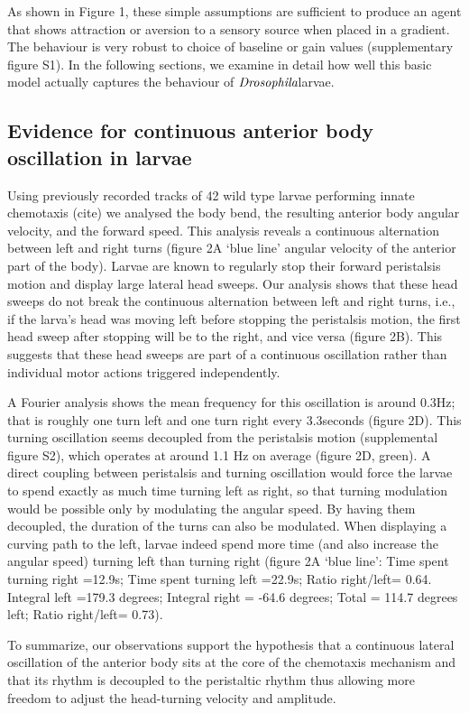 \documentclass[10pt,a4paper]{article}
\newcommand{\Dros }{$\mathrm{\emph{Drosophila}}$}
\begin{document}
As shown in Figure 1, these simple assumptions are sufficient to produce an agent that shows attraction or aversion to a sensory source when placed in a gradient.  The behaviour is very robust to choice of baseline or gain values (supplementary figure S1). In the following sections, we examine in detail how well this basic model actually captures the behaviour of \Dros larvae.

\subsection{Evidence for continuous anterior body oscillation in larvae}
Using previously recorded tracks of 42 wild type larvae performing innate chemotaxis (cite) we analysed the body bend, the resulting anterior body angular velocity, and the forward speed. This analysis reveals a continuous alternation between left and right turns (figure 2A ‘blue line’ angular velocity of the anterior part of the body). Larvae are known to regularly stop their forward peristalsis motion and display large lateral head sweeps. Our analysis shows that these head sweeps do not break the continuous alternation between left and right turns, i.e., if the larva’s head was moving left before stopping the peristalsis motion, the first head sweep after stopping will be to the right, and vice versa (figure 2B). This suggests that these head sweeps are part of a continuous oscillation rather than individual motor actions triggered independently.

A Fourier analysis shows the mean frequency for this oscillation is around 0.3Hz; that is roughly one turn left and one turn right every 3.3seconds (figure 2D). This turning oscillation seems decoupled from the peristalsis motion (supplemental figure S2), which operates at around 1.1 Hz on average (figure 2D, green). A direct coupling between peristalsis and turning oscillation would force the larvae to spend exactly as much time turning left as right, so that turning modulation would be possible only by modulating the angular speed. By having them decoupled, the duration of the turns can also be modulated. When displaying a curving path to the left, larvae indeed spend more time (and also increase the angular speed) turning left than turning right (figure 2A ‘blue line’:  Time spent turning right =12.9s; Time spent turning left =22.9s; Ratio right/left= 0.64. Integral left =179.3 degrees; Integral right = -64.6 degrees; Total = 114.7 degrees left; Ratio right/left= 0.73).

 To summarize, our observations support the hypothesis that a continuous lateral oscillation of the anterior body sits at the core of the chemotaxis mechanism and that its rhythm is decoupled to the peristaltic rhythm thus allowing more freedom to adjust the head-turning velocity and amplitude.
\end{document}
